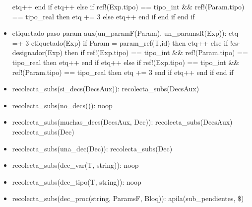 \documentclass[11pt]{article}
\begin{document}
\begin{itemize}
                        \subsubitem \hspace{4em} etq++
                    \subsubitem \hspace{2em} end if
                    \subsubitem \hspace{2em} etq++
                \subsubitem else
                    \subsubitem \hspace{2em} if ref!(Exp.tipo) == tipo\_int \&\& ref!(Param.tipo) == tipo\_real then
                        \subsubitem \hspace{4em} etq += 3
                    \subsubitem \hspace{2em} else
                        \subsubitem \hspace{4em} etq++
                    \subsubitem \hspace{2em} end if
                \subsubitem end if
            \subitem end if
        \item etiquetado-paso-param-aux(un\_paramF(Param), un\_paramsR(Exp)): 
            \subitem etq =+ 3
            \subitem etiquetado(Exp)
            \subitem if Param = param\_ref(T,id) then
                \subsubitem etq++
            \subitem else
                \subsubitem if !es-designador(Exp) then
                    \subsubitem \hspace{2em} if ref!(Exp.tipo) == tipo\_int \&\& ref!(Param.tipo) == tipo\_real then
                        \subsubitem \hspace{4em} etq++
                    \subsubitem \hspace{2em} end if
                    \subsubitem \hspace{2em} etq++
                \subsubitem else
                    \subsubitem \hspace{2em} if ref!(Exp.tipo) == tipo\_int \&\& ref!(Param.tipo) == tipo\_real then
                        \subsubitem \hspace{4em} etq += 3
                    \subsubitem \hspace{2em} end if
                    \subsubitem \hspace{2em} etq++
                \subsubitem end if
            \subitem end if
        \item recolecta\_subs(si\_decs(DecsAux)): 
            \subitem recolecta\_subs(DecsAux)
        \item recolecta\_subs(no\_decs()): 
            \subitem noop
        \item recolecta\_subs(muchas\_decs(DecsAux, Dec)): 
            \subitem recolecta\_subs(DecsAux)
            \subitem recolecta\_subs(Dec)
        \item recolecta\_subs(una\_dec(Dec)): 
            \subitem recolecta\_subs(Dec)
        \item recolecta\_subs(dec\_var(T, string)): 
            \subitem noop
        \item recolecta\_subs(dec\_tipo(T, string)): 
            \subitem noop
        \item recolecta\_subs(dec\_proc(string, ParamsF, Bloq)): 
            \subitem apila(sub\_pendientes, \$)
    \end{itemize} 
\end{document}

